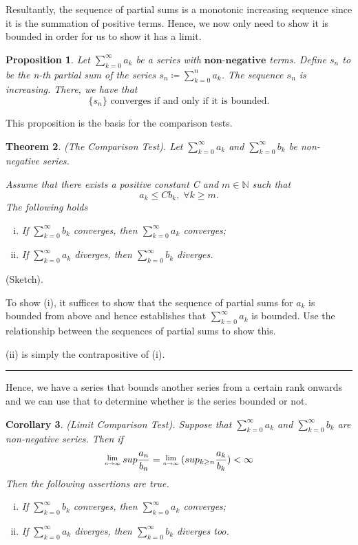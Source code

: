 \documentclass[twoside]{article}
\newcounter{lecnum}
\newcommand{\Lim}[1]{\raisebox{0.5ex}{\scalebox{0.8}{$\displaystyle \lim_{#1}\;$}}}
\newtheorem{theorem}{Theorem}[lecnum]
\newtheorem{proposition}[theorem]{Proposition}
\newtheorem{corollary}[theorem]{Corollary}
\newenvironment{proof}{{\bf Proof:}}{\hfill\rule{2mm}{2mm}}
\begin{document}
Resultantly, the sequence of partial sums is a monotonic increasing sequence since it is the summation of positive terms. Hence, we now only need to show it is bounded in order for us to show it has a limit.

\begin{proposition} Let $\sum_{k=0}^{\infty}a_k$ be a series with $\textbf{non-negative}$ terms. Define $s_n$ to be the n-th partial sum of the series $s_n \coloneqq \sum_{k=0}^na_k$. The sequence $s_n$ is increasing. There, we have that
$$
\{s_n\} \text{ converges if and only if it is bounded.}
$$
\end{proposition}

This proposition is the basis for the comparison tests.
\begin{theorem}
(The Comparison Test). Let $\sum_{k=0}^{\infty}a_k$ and $\sum_{k=0}^{\infty}b_k$ be non-negative series. 

Assume that there exists a positive constant C and $m \in \mathbb{N}$ such that
$$
a_k \leq Cb_k, \; \forall k \geq m.
$$
The following holds
\begin{enumerate}[(i)]
    \item If $\sum_{k=0}^{\infty}b_k$ converges, then $\sum_{k=0}^{\infty}a_k$ converges;
    \item If $\sum_{k=0}^{\infty}a_k$ diverges, then $\sum_{k=0}^{\infty}b_k$ diverges.
\end{enumerate}
\end{theorem}

\begin{proof} (Sketch). 

To show (i), it suffices to show that the sequence of partial sums for $a_k$ is bounded from above and hence establishes that $\sum_{k=0}^{\infty}a_k$ is bounded. Use the relationship between the sequences of partial sums to show this.

(ii) is simply the contrapositive of (i). 
\end{proof}

Hence, we have a series that bounds another series from a certain rank onwards and we can use that to determine whether is the series bounded or not.

\begin{corollary}
(Limit Comparison Test). Suppose that $\sum_{k=0}^{\infty}a_k$ and $\sum_{k=0}^{\infty}b_k$ are non-negative series. Then if
$$
\Lim{n \rightarrow \infty}sup\frac{a_n}{b_n}  = \Lim{n \rightarrow \infty}(sup_{k \geq n}\frac{a_k}{b_k})< \infty
$$
Then the following assertions are true.
\begin{enumerate}[(i)]
    \item If $\sum_{k=0}^{\infty}b_k$ converges, then $\sum_{k=0}^{\infty}a_k$ converges;
    \item If $\sum_{k=0}^{\infty}a_k$ diverges, then $\sum_{k=0}^{\infty}b_k$ diverges too.
\end{enumerate}
\end{corollary}
\end{document}

